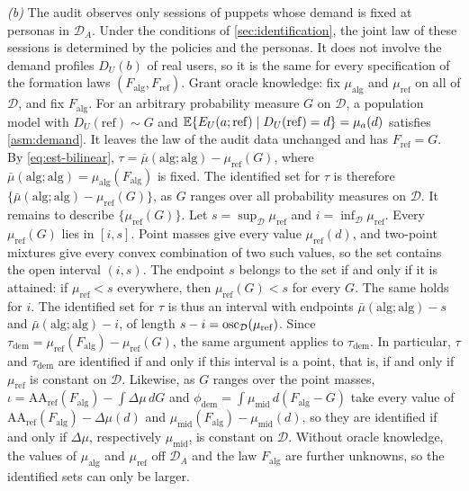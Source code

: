 \emph{(b)} The audit observes only sessions of puppets whose demand is fixed at personas in $\mathcal D_A$. Under the conditions of \cref{sec:identification}, the joint law of these sessions is determined by the policies and the personas. It does not involve the demand profiles $D_U(b)$ of real users, so it is the same for every specification of the formation laws $(F_{\mathrm{alg}},F_{\mathrm{ref}})$. Grant oracle knowledge: fix $\mu_{\mathrm{alg}}$ and $\mu_{\mathrm{ref}}$ on all of $\mathcal D$, and fix $F_{\mathrm{alg}}$. For an arbitrary probability measure $G$ on $\mathcal D$, a population model with $D_U(\mathrm{ref})\sim G$ and $\mathbb{E}\{E_U(a;\mathrm{ref})\mid D_U(\mathrm{ref})=d\}=\mu_a(d)$ satisfies \cref{asm:demand}. It leaves the law of the audit data unchanged and has $F_{\mathrm{ref}}=G$. By \eqref{eq:est-bilinear}, $\tau=\bar\mu(\mathrm{alg};\mathrm{alg})-\mu_{\mathrm{ref}}(G)$, where $\bar\mu(\mathrm{alg};\mathrm{alg})=\mu_{\mathrm{alg}}(F_{\mathrm{alg}})$ is fixed. The identified set for $\tau$ is therefore $\{\bar\mu(\mathrm{alg};\mathrm{alg})-\mu_{\mathrm{ref}}(G)\}$, as $G$ ranges over all probability measures on $\mathcal D$.
It remains to describe $\{\mu_{\mathrm{ref}}(G)\}$. Let $s=\sup_{\mathcal D}\mu_{\mathrm{ref}}$ and $i=\inf_{\mathcal D}\mu_{\mathrm{ref}}$. Every $\mu_{\mathrm{ref}}(G)$ lies in $[i,s]$. Point masses give every value $\mu_{\mathrm{ref}}(d)$, and two-point mixtures give every convex combination of two such values, so the set contains the open interval $(i,s)$. The endpoint $s$ belongs to the set if and only if it is attained: if $\mu_{\mathrm{ref}}<s$ everywhere, then $\mu_{\mathrm{ref}}(G)<s$ for every $G$. The same holds for $i$. The identified set for $\tau$ is thus an interval with endpoints $\bar\mu(\mathrm{alg};\mathrm{alg})-s$ and $\bar\mu(\mathrm{alg};\mathrm{alg})-i$, of length $s-i=\operatorname{osc}_{\mathcal D}(\mu_{\mathrm{ref}})$. Since $\tau_{\mathrm{dem}}=\mu_{\mathrm{ref}}(F_{\mathrm{alg}})-\mu_{\mathrm{ref}}(G)$, the same argument applies to $\tau_{\mathrm{dem}}$. In particular, $\tau$ and $\tau_{\mathrm{dem}}$ are identified if and only if this interval is a point, that is, if and only if $\mu_{\mathrm{ref}}$ is constant on $\mathcal D$. Likewise, as $G$ ranges over the point masses, $\iota=\mathrm{AA}_{\mathrm{ref}}(F_{\mathrm{alg}})-\int\Delta\mu\,dG$ and $\phi_{\mathrm{dem}}=\int\mu_{\mathrm{mid}}\,d(F_{\mathrm{alg}}-G)$ take every value of $\mathrm{AA}_{\mathrm{ref}}(F_{\mathrm{alg}})-\Delta\mu(d)$ and $\mu_{\mathrm{mid}}(F_{\mathrm{alg}})-\mu_{\mathrm{mid}}(d)$, so they are identified if and only if $\Delta\mu$, respectively $\mu_{\mathrm{mid}}$, is constant on $\mathcal D$. Without oracle knowledge, the values of $\mu_{\mathrm{alg}}$ and $\mu_{\mathrm{ref}}$ off $\mathcal D_A$ and the law $F_{\mathrm{alg}}$ are further unknowns, so the identified sets can only be larger.

